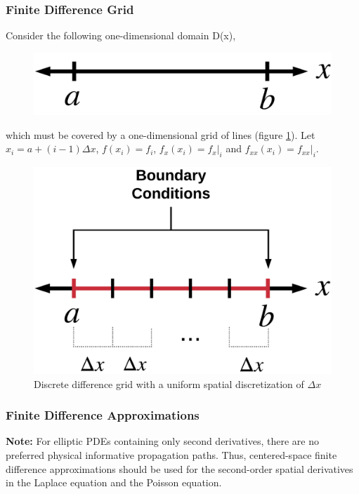\documentclass[../main.tex]{subfiles}
\begin{document}
\subsubsection{Finite Difference Grid}
Consider the following one-dimensional domain D(x),
\begin{figure}[H]\label{fig:Domain}
\center\includegraphics[scale = 0.5]{../image.png}
\end{figure}
\noindent which must be covered by a one-dimensional grid of lines (figure \ref{fig:Domain}). Let $x_i = a + (i-1)\Delta x$, $f(x_i) = f_i$, $f_x(x_i) = f_x|_i$ and $f_{xx}(x_i) = f_{xx}|_i$.

\begin{figure}[H]
	\center\includegraphics[scale=0.5]{../image1.png}
    \caption{Discrete difference grid with a uniform spatial discretization of $\Delta x$}
    \label{fig:SolutionDomain}
\end{figure}

\subsubsection{Finite Difference Approximations}
\color{red}\textbf{Note:} For elliptic PDEs containing only second derivatives, there are no preferred physical informative propagation paths. Thus, centered-space finite difference approximations should be used for the second-order spatial derivatives in the Laplace equation and the Poisson equation.\color{black}
\end{document}
